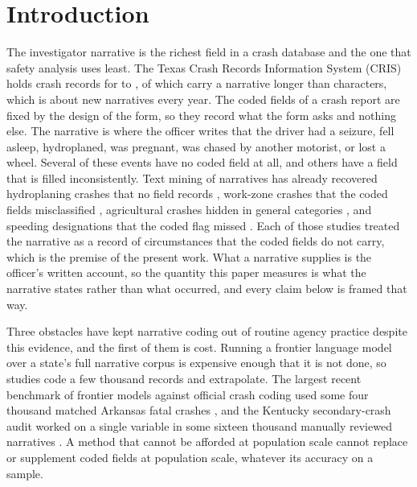 \section{Introduction}
\label{sec:intro}

The investigator narrative is the richest field in a crash database and the one that safety
analysis uses least. The Texas Crash Records Information System (CRIS) holds \Nrecords{}
crash records for \FirstYear{} to \LastYear{}, of which \Ncorpus{} carry a narrative longer
than \MinChars{} characters, which is about \TexasPerYear{} new narratives every year. The
coded fields of a crash report are fixed by the design of the form, so they record what the
form asks and nothing else. The narrative is where the officer writes that the driver had a
seizure, fell asleep, hydroplaned, was pregnant, was chased by another motorist, or lost a
wheel. Several of these events have no coded field at all, and others have a field that is
filled inconsistently. Text mining of narratives has already recovered hydroplaning crashes
that no field records \citep{das2020hydroplaning}, work-zone crashes that the coded fields
misclassified \citep{sayed2021identifica}, agricultural crashes hidden in general categories
\citep{kim2021crash}, and speeding designations that the coded flag missed
\citep{fitzpatrick2017an}. Each of those studies treated the narrative as a record of
circumstances that the coded fields do not carry, which is the premise of the present work.
What a narrative supplies is the officer's written account, so the quantity this paper measures
is what the narrative states rather than what occurred, and every claim below is framed that
way.

Three obstacles have kept narrative coding out of routine agency practice despite this
evidence, and the first of them is cost. Running a frontier language model over a state's
full narrative corpus is expensive enough that it is not done, so studies code a few thousand
records and extrapolate. The largest recent benchmark of frontier models against official crash coding
used some four thousand matched Arkansas fatal crashes \citep{bharati2026benchmarking}, and the Kentucky secondary-crash audit worked on a single variable in some sixteen thousand manually reviewed narratives \citep{zhang2025secondary}. A method that cannot be afforded at population scale cannot
replace or supplement coded fields at population scale, whatever its accuracy on a sample.

